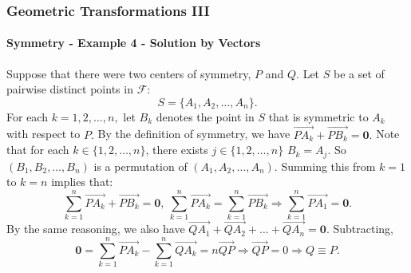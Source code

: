 \documentclass[8pt,xcolor=table,dvipsnames]{beamer}
\begin{document}
\begin{frame}[t]
    \frametitle{Geometric Transformations III}
    \framesubtitle{Symmetry - Example 4 - Solution by Vectors}
    Suppose that there were two centers of symmetry, $P$ and $Q.$ Let $S$ be a set of pairwise distinct points in $\mathcal{F}$:
    \[ S = \{A_1,A_2, \ldots, A_n\}. \]
    \bigbreak
    For each $k = 1,2, \ldots, n,$ let $B_k$ denotes the point in $S$ that is symmetric to $A_k$ with respect to $P.$
    \bigbreak
    By the definition of symmetry, we have $\overrightarrow{PA_k} + \overrightarrow{PB_k} = \textbf{0}.$
    \bigbreak
    Note that for each $k \in \{1,2, \ldots, n\}$, there exists $j\in \{1,2, \ldots, n\}$ $B_k = A_j.$
    So $(B_1, B_2,\ldots, B_n)$ is a permutation of $(A_1, A_2,\ldots, A_n).$
    \bigbreak
    Summing this from $k = 1$ to $k = n$ implies that:
    \[ 
        \sum_{k=1}^{n} \overrightarrow{PA_k} + \overrightarrow{PB_k} = \textbf{0},\ 
        \sum_{k=1}^{n} \overrightarrow{PA_k} = \sum_{k=1}^{n} \overrightarrow{PB_k}
        \Rightarrow \sum_{k=1}^{n} \overrightarrow{PA_1} = \textbf{0}.
    \]
    \onslide<5->By the same reasoning, we also have $\overrightarrow{QA_1} + \overrightarrow{QA_2} + \ldots + \overrightarrow{QA_n} = \textbf{0}.$
    Subtracting, 
    \[ 
        \textbf{0} = \sum_{k=1}^{n}  \overrightarrow{PA_k} -  \sum_{k=1}^{n} \overrightarrow{QA_k} = n\overrightarrow{QP} 
        \Rightarrow \overrightarrow{QP} = 0 \Rightarrow \boxed{Q \equiv P.}
    \]
\end{frame}
\end{document}
